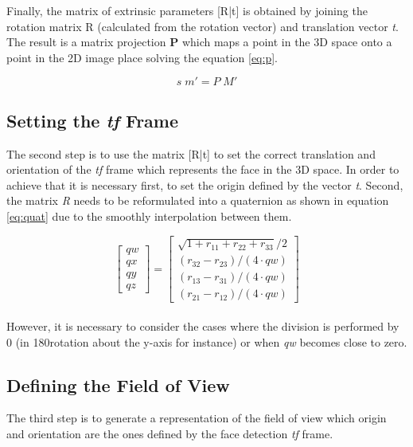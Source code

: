 \documentclass{sig-alternate}
\begin{document}
Finally, the matrix of extrinsic parameters [R|t] is obtained by joining the rotation matrix R (calculated from the rotation vector) and translation vector \textit{t}. The result is a matrix projection \textbf{P} which maps a point in the 3D space onto a point in the 2D image place solving the equation \ref{eq:p}.

\begin{equation}
s  \; m' = P \; M'
\label{eq:p}
\end{equation}

\subsection{Setting the \textit{tf} Frame}
The second step is to use the matrix [R|t] to set the correct translation and orientation of the \textit{tf} frame which represents the face in the 3D space. In order to achieve that it is necessary first, to set the origin defined by the vector \textit{t}. Second, the matrix \textit{R} needs to be reformulated into a quaternion as shown in equation \ref{eq:quat} due to the smoothly interpolation between them.

\begin{equation}
\begin{bmatrix}
qw \\
qx \\
qy \\
qz
\end{bmatrix}
=
\begin{bmatrix}
\sqrt{1 + r_{11} + r_{22} + r_{33}} /2 \\
(r_{32} - r_{23})/( 4 \cdot qw) \\
(r_{13} - r_{31})/( 4 \cdot qw) \\
(r_{21} - r_{12})/( 4 \cdot qw)
\end{bmatrix}
\label{eq:quat}
\end{equation}
\\
However, it is necessary to consider the cases where the division is performed by 0 (in 180\degree rotation about the y-axis for instance) or when \textit{qw} becomes close to zero.

\subsection{Defining the Field of View}
The third step is to generate a representation of the field of view which origin and orientation are the ones defined by the face detection \textit{tf} frame. 
\end{document}
